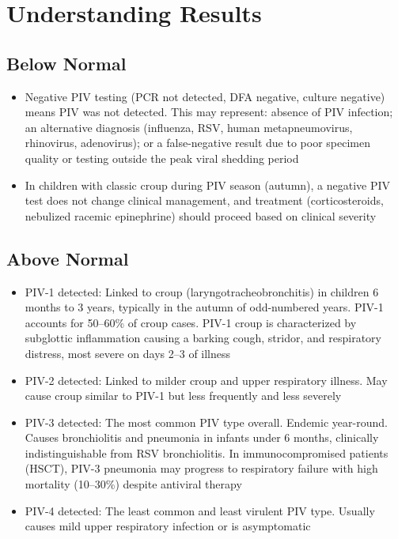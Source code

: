 \section*{Understanding Results}

\subsection*{Below Normal}
\begin{itemize}
  \item Negative PIV testing (PCR not detected, DFA negative, culture negative) means PIV was not detected. This may represent: absence of PIV infection; an alternative diagnosis (influenza, RSV, human metapneumovirus, rhinovirus, adenovirus); or a false-negative result due to poor specimen quality or testing outside the peak viral shedding period
  \item In children with classic croup during PIV season (autumn), a negative PIV test does not change clinical management, and treatment (corticosteroids, nebulized racemic epinephrine) should proceed based on clinical severity
\end{itemize}

\subsection*{Above Normal}
\begin{itemize}
  \item PIV-1 detected: Linked to croup (laryngotracheobronchitis) in children 6 months to 3 years, typically in the autumn of odd-numbered years. PIV-1 accounts for 50--60\% of croup cases. PIV-1 croup is characterized by subglottic inflammation causing a barking cough, stridor, and respiratory distress, most severe on days 2--3 of illness
  \item PIV-2 detected: Linked to milder croup and upper respiratory illness. May cause croup similar to PIV-1 but less frequently and less severely
  \item PIV-3 detected: The most common PIV type overall. Endemic year-round. Causes bronchiolitis and pneumonia in infants under 6 months, clinically indistinguishable from RSV bronchiolitis. In immunocompromised patients (HSCT), PIV-3 pneumonia may progress to respiratory failure with high mortality (10--30\%) despite antiviral therapy \cite{russell2017parainfluenza}
  \item PIV-4 detected: The least common and least virulent PIV type. Usually causes mild upper respiratory infection or is asymptomatic
\end{itemize}


